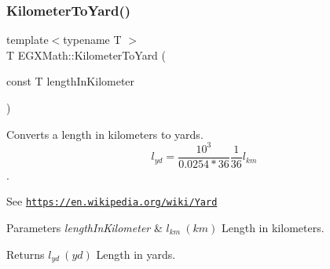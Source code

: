 \subsubsection{\texorpdfstring{Kilometer\+To\+Yard()}{KilometerToYard()}}
{\footnotesize\ttfamily template$<$typename T $>$ \\
T E\+G\+X\+Math\+::\+Kilometer\+To\+Yard (\begin{DoxyParamCaption}\item[{const T}]{length\+In\+Kilometer }\end{DoxyParamCaption})}



Converts a length in kilometers to yards. \[ l_{yd}= \frac{10^{3}}{0.0254 * 36} \frac{1}{36} l_{km} \]. 

See \href{https://en.wikipedia.org/wiki/Yard}{\tt https\+://en.\+wikipedia.\+org/wiki/\+Yard} 
\begin{DoxyParams}{Parameters}
{\em length\+In\+Kilometer} & $ l_{km}\ (km)$ Length in kilometers. \\
\hline
\end{DoxyParams}
\begin{DoxyReturn}{Returns}
$ l_{yd}\ (yd)$ Length in yards. 
\end{DoxyReturn}
